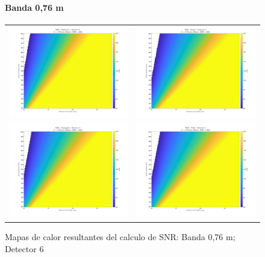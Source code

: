 \begin{landscape}
\begin{figure}[p]
\centering
\setlength{\tabcolsep}{2pt}
\renewcommand{\arraystretch}{0}

\paragraph{Banda 0,76 \textmu m}
\begin{tabular}{cc}
\includegraphics[width=0.48\linewidth]{4.Payload/SNR/SNR_Lambda3_Detector6_Telescopio1_heatmap.jpg} &
\includegraphics[width=0.48\linewidth]{4.Payload/SNR/SNR_Lambda3_Detector6_Telescopio2_heatmap.jpg} \\
\includegraphics[width=0.48\linewidth]{4.Payload/SNR/SNR_Lambda3_Detector6_Telescopio3_heatmap.jpg} &
\includegraphics[width=0.48\linewidth]{4.Payload/SNR/SNR_Lambda3_Detector6_Telescopio4_heatmap.jpg} \\
\end{tabular}
\caption{Mapas de calor resultantes del calculo de SNR: Banda 0,76 \textmu m; Detector 6}
\end{figure}
\end{landscape}


